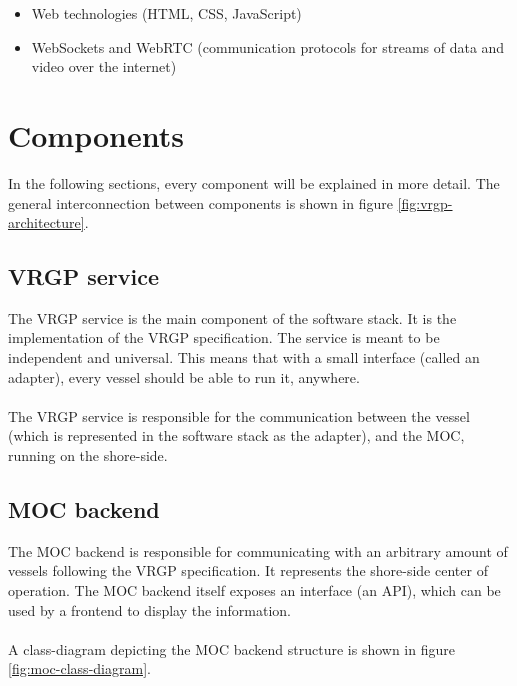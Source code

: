 \begin{itemize}
	\item Web technologies (HTML, CSS, JavaScript)
	\item WebSockets and WebRTC (communication protocols for streams of data and video over the internet)
\end{itemize}

\section{Components}\label{sec:components}

In the following sections, every component will be explained in more detail. The general interconnection between components is shown in figure \ref{fig:vrgp-architecture}.

\subsection{VRGP service}

The VRGP service is the main component of the software stack. It is the implementation of the VRGP specification. The service is meant to be independent and universal. This means that with a small interface (called an adapter), every vessel should be able to run it, anywhere.
\\\\
The VRGP service is responsible for the communication between the vessel (which is represented in the software stack as the adapter), and the MOC, running on the shore-side.

\subsection{MOC backend}

The MOC backend is responsible for communicating with an arbitrary amount of vessels following the VRGP specification. It represents the shore-side center of operation. The MOC backend itself exposes an interface (an API), which can be used by a frontend to display the information.
\\\\
A class-diagram depicting the MOC backend structure is shown in figure \ref{fig:moc-class-diagram}.

